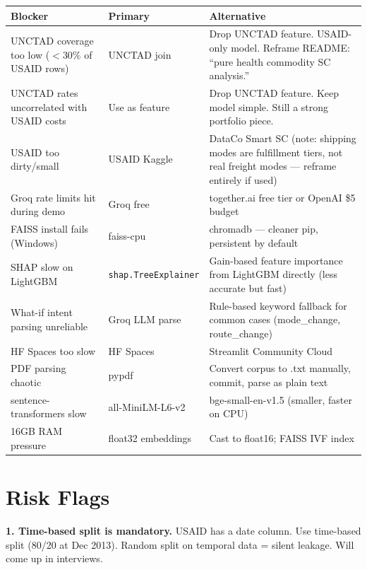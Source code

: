 \documentclass[11pt, a4paper]{article}
\begin{document}
\begin{tabularx}{\textwidth}{lXX}
\toprule
\textbf{Blocker} & \textbf{Primary} & \textbf{Alternative} \\
\midrule
UNCTAD coverage too low ($<$30\% of USAID rows) & UNCTAD join & Drop UNCTAD feature. USAID-only model. Reframe README: ``pure health commodity SC analysis.'' \\
\addlinespace
UNCTAD rates uncorrelated with USAID costs & Use as feature & Drop UNCTAD feature. Keep model simple. Still a strong portfolio piece. \\
\addlinespace
USAID too dirty/small & USAID Kaggle & DataCo Smart SC (note: shipping modes are fulfillment tiers, not real freight modes --- reframe entirely if used) \\
\addlinespace
Groq rate limits hit during demo & Groq free & together.ai free tier or OpenAI \$5 budget \\
\addlinespace
FAISS install fails (Windows) & faiss-cpu & chromadb --- cleaner pip, persistent by default \\
\addlinespace
SHAP slow on LightGBM & \texttt{shap.TreeExplainer} & Gain-based feature importance from LightGBM directly (less accurate but fast) \\
\addlinespace
What-if intent parsing unreliable & Groq LLM parse & Rule-based keyword fallback for common cases (mode\_change, route\_change) \\
\addlinespace
HF Spaces too slow & HF Spaces & Streamlit Community Cloud \\
\addlinespace
PDF parsing chaotic & pypdf & Convert corpus to .txt manually, commit, parse as plain text \\
\addlinespace
sentence-transformers slow & all-MiniLM-L6-v2 & bge-small-en-v1.5 (smaller, faster on CPU) \\
\addlinespace
16GB RAM pressure & float32 embeddings & Cast to float16; FAISS IVF index \\
\bottomrule
\end{tabularx}

\section{Risk Flags}

\begin{warnbox}
\textbf{1. Time-based split is mandatory.} USAID has a date column. Use time-based split (80/20 at Dec 2013). Random split on temporal data = silent leakage. Will come up in interviews.
\end{warnbox}
\end{document}
